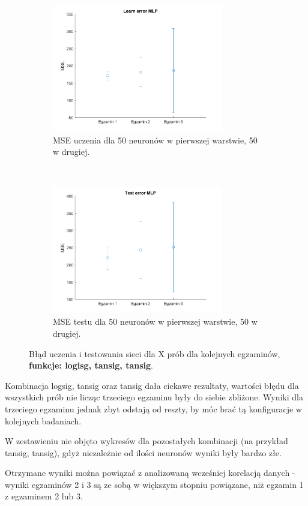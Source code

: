 \documentclass[12pt]{article}
\begin{document}
\begin{figure}[H]
\begin{subfigure}[t]{0.48\textwidth} 
\centering
\includegraphics[height=2.2in]{logsig_tansig_tansig50_learn.png}
\caption{MSE uczenia dla  50 neuronów w pierwszej warstwie, 50 w drugiej.}
\end{subfigure}
~~
\begin{subfigure}[t]{0.48\textwidth} 
\centering
\includegraphics[height=2.2in]{logsig_tansig_tansig50_test.png}
\caption{MSE testu dla 50 neuronów w pierwszej warstwie, 50 w drugiej.}
\end{subfigure}

\caption{Błąd uczenia i testowania sieci dla X prób dla kolejnych egzaminów, \textbf{funkcje: logisg, tansig, tansig}.}
\end{figure}

Kombinacja logsig, tansig oraz tansig dała ciekawe rezultaty, wartości błędu dla wszystkich prób nie licząc trzeciego egzaminu były do siebie zbliżone. Wyniki dla trzeciego egzaminu jednak zbyt odstają od reszty, by móc brać tą konfiguracje w kolejnych badaniach.

W zestawieniu nie objęto wykresów dla pozostałych kombinacji (na przykład tansig, tansig),  gdyż niezależnie od ilości neuronów wyniki były bardzo złe.

Otrzymane wyniki można powiązać z analizowaną wcześniej korelacją danych - wyniki egzaminów 2 i 3 są ze sobą w większym stopniu powiązane, niż egzamin 1 z egzaminem 2 lub 3.
\end{document}
